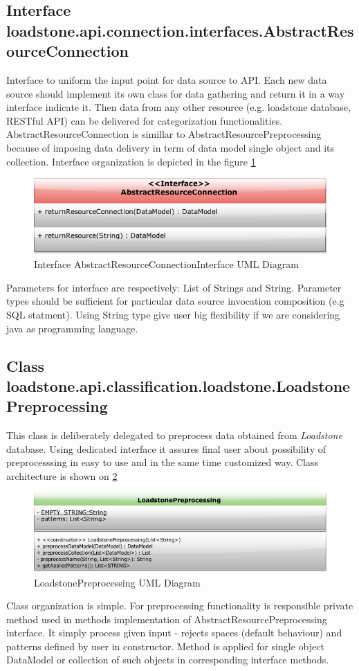 \subsection{Interface loadstone.api.connection.interfaces.AbstractResourceConnection}
Interface to uniform the input point for data source to API. Each new data source should implement its own class for data gathering and return it in a way interface indicate it. Then data from any other resource (e.g. loadstone database, RESTful API) can be delivered for categorization functionalities. AbstractResourceConnection is simillar to AbstractResourcePreprocessing because of imposing data delivery in term of data model single object and its collection. Interface organization is depicted in the figure \ref{fig:@=connection}   
\begin{figure}[h]
	\centering
	\includegraphics[scale=0.5]{Abstract_Resource_Connection_Interface.png}
	\caption{Interface AbstractResourceConnectionInterface UML Diagram}
	\label{fig:@=connection}
\end{figure}
Parameters for interface are respectively: List of Strings and String. Parameter types should be sufficient for particular data source invocation composition (e.g SQL statment). Using String type give user big flexibility if we are considering java as programming language.
\subsection{Class loadstone.api.classification.loadstone.LoadstonePreprocessing}
This class is deliberately delegated to preprocess data obtained from \textit{Loadstone} database. Using dedicated interface it assures final user about possibility of preprocesssing in easy to use and in the same time customized way. Class architecture is shown on \ref{fig:@=LoadstonePreprocessing}
\begin{figure}[h]
	\centering
	\includegraphics[scale=0.5]{LoadstonePreprocessing.png}
	\caption{LoadstonePreprocessing UML Diagram}
	\label{fig:@=LoadstonePreprocessing}
\end{figure}
Class organization is simple. For preprocessing functionality is responsible private method used in methods implementation of AbstractResourcePreprocessing interface. It simply process given input - rejects spaces (default behaviour) and patterns defined by user in constructor. Method is applied for single object DataModel or collection of such objects in corresponding interface methods.

